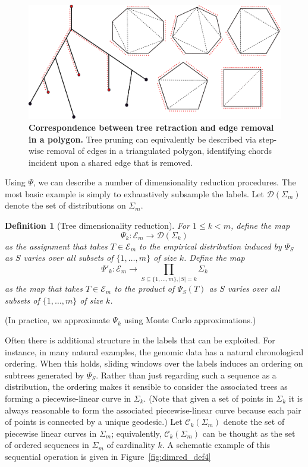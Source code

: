 \documentclass[a4paper,11pt]{article}
\newtheorem{definition}[theorem]{Definition}
\newcommand{\aC}{\mathcal{C}}
\newcommand{\aD}{\mathcal{D}}
\newcommand{\aE}{\mathcal{E}}
\begin{document}
\begin{figure}
    \centering
    \includegraphics[width=6in]{../figures/dimred_def2.pdf}
    \caption{{\bf Correspondence between tree retraction and edge removal in a polygon.} Tree pruning can equivalently be described via step-wise removal of edges in a triangulated polygon, identifying chords incident upon a shared edge that is removed.}
    \label{fig:dimred_def2}
\end{figure} 

Using $\Psi$, we can describe a number of dimensionality reduction procedures.
The most basic example is simply to exhaustively subsample the labels.
Let $\aD(\Sigma_m)$ denote the set of distributions on $\Sigma_m$.

\begin{definition}[Tree dimensionality reduction]
For $1 \leq k < m$, define the map
\[
\Psi_k \colon \aE_m \to \aD(\Sigma_k)
\]
as the assignment that takes $T \in \aE_m$ to the empirical distribution induced by $\Psi_S$ as $S$ varies over all subsets of $\{1,\ldots,m\}$ of size $k$.
Define the map
\[
\Psi'_k \colon \aE_m \to \prod_{S \subseteq \{1,\ldots,m\}, |S| = k} \Sigma_k 
\]
as the map that takes $T \in \aE_m$ to the product of $\Psi_S(T)$ as $S$ varies over all subsets of $\{1, \ldots, m\}$ of size $k$.
\end{definition}

(In practice, we approximate $\Psi_k$ using Monte Carlo approximations.)

Often there is additional structure in the labels that can be exploited.
For instance, in many natural examples, the genomic data has a natural chronological ordering.
When this holds, sliding windows over the labels induces an ordering on subtrees generated by $\Psi_S$.
Rather than just regarding such a sequence as a distribution, the ordering makes it sensible to consider the associated trees as forming a piecewise-linear curve in $\Sigma_k$.
(Note that given a set of points in $\Sigma_k$ it is always reasonable to form the associated piecewise-linear curve because each pair of points is connected by a unique geodesic.)
Let $\aC_k(\Sigma_m)$ denote the set of piecewise linear curves in $\Sigma_m$; equivalently, $\aC_k(\Sigma_m)$ can be thought as the set of ordered sequences in $\Sigma_m$ of cardinality $k$.
A schematic example of this sequential operation is given in Figure~\ref{fig:dimred_def4}
\end{document}
